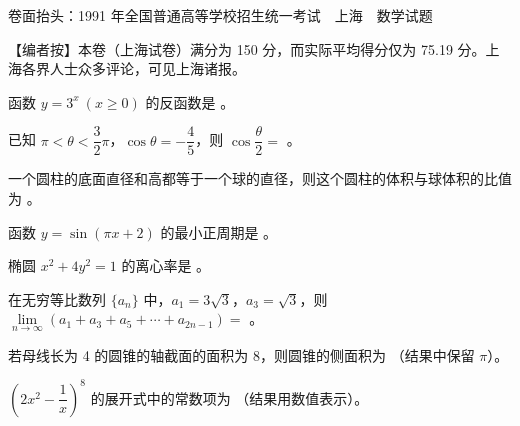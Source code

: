 

\begin{gktip}
卷面抬头：1991 年全国普通高等学校招生统一考试　上海　数学试题

【编者按】本卷（上海试卷）满分为 150 分，而实际平均得分仅为 75.19 分。上海各界人士众多评论，可见上海诸报。
\end{gktip}


\begin{question}
函数 $y=3^{x}\ (x\ge 0)$ 的反函数是 \gkblank{}。

\end{question}
\begin{question}
已知 $\pi<\theta<\dfrac{3}{2}\pi$，$\cos\theta=-\dfrac{4}{5}$，则 $\cos\dfrac{\theta}{2}=$ \gkblank{}。

\end{question}
\begin{question}
一个圆柱的底面直径和高都等于一个球的直径，则这个圆柱的体积与球体积的比值为 \gkblank{}。

\end{question}
\begin{question}
函数 $y=\sin(\pi x+2)$ 的最小正周期是 \gkblank{}。

\end{question}
\begin{question}
椭圆 $x^{2}+4y^{2}=1$ 的离心率是 \gkblank{}。

\end{question}
\begin{question}
在无穷等比数列 $\{a_{n}\}$ 中，$a_{1}=3\sqrt{3}$，$a_{3}=\sqrt{3}$，则 $\lim\limits_{n\to\infty}(a_{1}+a_{3}+a_{5}+\cdots+a_{2n-1})=$ \gkblank{}。

\end{question}
\begin{question}
若母线长为 4 的圆锥的轴截面的面积为 8，则圆锥的侧面积为 \gkblank{}（结果中保留 $\pi$）。

\end{question}
\begin{question}
$\left(2x^{2}-\dfrac{1}{x}\right)^{8}$ 的展开式中的常数项为 \gkblank{}（结果用数值表示）。

\end{question}
